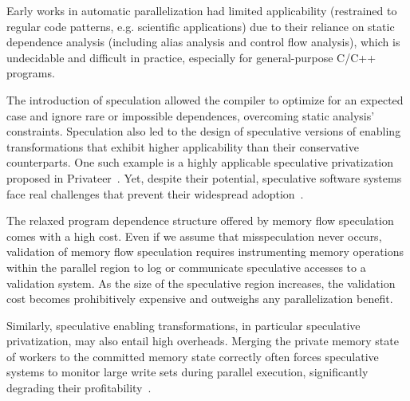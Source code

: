 Early works in automatic parallelization had limited applicability
(restrained to regular code patterns, e.g. scientific applications)
due to their reliance on static dependence analysis (including alias
analysis and control flow analysis), which is undecidable and
difficult in practice, especially for general-purpose C/C++ programs.

The introduction of speculation allowed the compiler to optimize for an
expected case and ignore rare or impossible dependences, overcoming static
analysis' constraints.
Speculation also led to the design of speculative versions of enabling
transformations that exhibit higher applicability than their
conservative counterparts.  One such example is a highly applicable
speculative privatization proposed in Privateer~\cite{johnson:12:pldi}.
%
Yet, despite their potential, speculative software systems face real
challenges that prevent their widespread
adoption~\cite{cascaval:08:stmtoy:short, .., ..}.
%

The relaxed program dependence structure offered by memory flow
speculation comes with a high cost.  Even if we assume that
misspeculation never occurs, validation of memory flow speculation
requires instrumenting memory operations within the parallel region to
log or communicate speculative accesses to a validation system. As the
size of the speculative region increases, the validation cost becomes
prohibitively expensive and outweighs any parallelization benefit.

Similarly, speculative enabling transformations,
in particular speculative privatization, may also entail high
overheads.  Merging the private memory state of workers to the
committed memory state correctly often forces speculative systems to monitor
large write sets during parallel execution, significantly degrading
their profitability~\cite{kim:12:cgo,johnson:12:pldi}.

